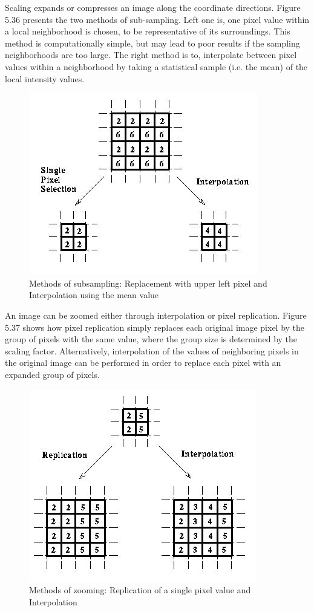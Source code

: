 Scaling expands or compresses an image along the coordinate directions. Figure 5.36 presents the two methods of sub-sampling. Left one is, one pixel value within a local neighborhood is chosen, to be representative of its surroundings. This method is computationally simple, but may lead to poor results if the sampling neighborhoods are too large. The right method is to, interpolate between pixel values within a neighborhood by taking a statistical sample (i.e. the mean) of the local intensity values.
\begin{figure}[!h]
	\centering
	\includegraphics[scale=0.75]{img/method}
	\caption{Methods of subsampling: Replacement with upper left pixel and Interpolation using the mean value}
\end{figure}

\newpage
An image can be zoomed either through interpolation or  pixel replication. Figure 5.37 shows how pixel replication simply replaces each original image pixel by the group of pixels with the same value, where the group size is determined by the scaling factor. Alternatively, interpolation of the values of neighboring pixels in the original image can be performed in order to replace each pixel with an expanded group of pixels. 

\begin{figure}[!h]
	\centering
	\includegraphics[scale=0.75]{img/method2}
	\caption{Methods of zooming: Replication of a single pixel value and Interpolation}
\end{figure}